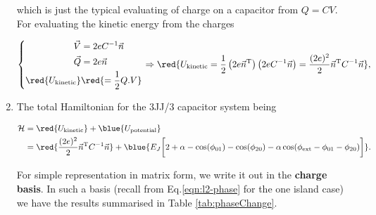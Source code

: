 \begin{enumerate}
  \noindent  which  is  just  the  typical evaluating  of  charge  on  a
  capacitor from $ Q = CV $.  For evaluating the kinetic energy from the
  charges

  \begin{equation}
    \left\lbrace \begin{aligned}
        \vec{V} & = 2eC^{-1}\vec{n}\\
        \vec{Q} & = 2e\vec{n}\\
        \red{U_{\text{kinetic}}} & \red{= \frac{1}{2}Q.V}\\
      \end{aligned}\right.  \Rightarrow \red{U_{\text{kinetic}} =
      \frac{1}{2}\left(2e\vec{n}^{\text{T}}\right)\left(2eC^{-1}\vec{n}\right)               =
      \frac{(2e)^2}{2}\vec{n}^{\text{T}}C^{-1}\vec{n}},
  \end{equation}


\item The total Hamiltonian for the 3JJ/3 capacitor system being

  \begin{equation}
    \label{eqn:l23JJ}
    \begin{aligned}
      \mathcal{H}       &       =       \red{U_{\text{kinetic}}}       +
      \blue{U_{\text{potential}}}\\                  &                 =
      \red{\frac{(2e)^2}{2}\vec{n}^{\text{T}}C^{-1}\vec{n}}            +
      \blue{E_J\bigg[2+\alpha  -  \cos(\phi_{01})  -  \cos(\phi_{20})  -
        \alpha\cos(\phi_\text{ext}-\phi_{01} - \phi_{20})\bigg]}.
    \end{aligned}
  \end{equation}

  For  simple representation  in matrix  form, we  write it  out in  the
  \textbf{charge    basis}.    In    such   a    basis   (recall    from
  Eq.\eqref{eqn:l2-phase} for the  one island case) we  have the results
  summarised in Table \ref{tab:phaseChange}.


\end{enumerate}
